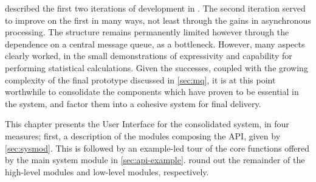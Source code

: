  described the first two iterations of development in \lsr{}.
The second iteration served to improve on the first in many ways, not least through the gains in asynchronous processing.
The structure remains permanently limited however through the dependence on a central message queue, as a bottleneck.
However, many aspects clearly worked, in the small demonstrations of expressivity and capability for performing statistical calculations.
Given the successes, coupled with the growing complexity of the final prototype discussed in \cref{sec:mq}, it is at this point worthwhile to consolidate the components which have proven to be essential in the system, and factor them into a cohesive system for final delivery.

This chapter presents the User Interface for the consolidated system, in four measures; first, a description of the modules composing the API, given by \cref{sec:sysmod}.
This is followed by an example-led tour of the core functions offered by the main system module in \cref{sec:api-example}.
 round out the remainder of the high-level modules and low-level modules, respectively.
